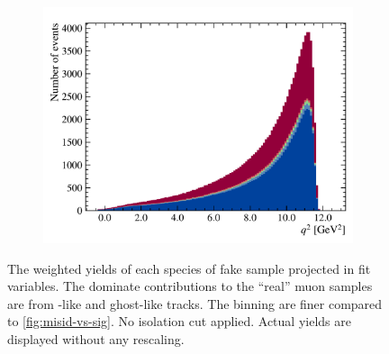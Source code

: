 \begin{figure}[!htb]
    \hfill
    \begin{subfigure}[b]{0.32\textwidth}
        \centering
        \includegraphics[width=\textwidth]{figs-fit-fit-templates/data-driven-plots/misid/D0_q2.pdf}
    \end{subfigure}
    \caption[Weighted yields of fake \muon sample.]{
        The weighted yields of each species of fake \muon sample projected in
        fit variables.
        The dominate contributions to the ``real'' muon samples are from
        \pion-like and ghost-like tracks.
        The binning are finer compared to \cref{fig:misid-vs-sig}.
        No isolation cut applied.
        Actual yields are displayed without any rescaling.
    }
    \label{fig:unfolding-fit-vars}
\end{figure}

